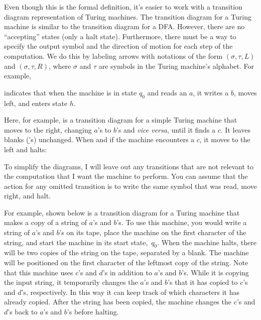 \medskip

Even though this is the formal definition, it's easier to work with
a transition diagram representation of Turing machines.  The transition
diagram for a Turing machine is similar to the transition diagram for
a DFA.  However, there are no ``accepting'' states (only a halt state).
Furthermore, there must be a way to specify the output symbol and
the direction of motion for each step of the computation.
We do this by labeling arrows with notations of the
form $(\sigma,\tau,L)$ and $(\sigma,\tau,R)$, where
$\sigma$ and $\tau$ are symbols in the Turing machine's alphabet.
For example,

\medbreak
\centerline{}
\medbreak

\noindent indicates that when the machine is in state $q_0$ and
reads an $a$, it writes a $b$, moves left, and enters state $h$.


Here, for example, is a transition diagram for a simple Turing machine
that moves to the right, changing $a$'s to $b$'s and \textit{vice
versa}, until it finds a $c$.  It leaves blanks (\b's) unchanged.
When and if the machine encounters a $c$, it moves to the left
and halts:

\medbreak
\centerline{}
\medbreak


To simplify the diagrams, I will leave out any transitions that are
not relevant to the computation that I want the machine to perform.
You can assume that the action for any omitted transition is
to write the same symbol that was read, move right, and halt.

For example, shown below is a transition diagram for a Turing machine
that makes a copy of a string of $a$'s and $b$'s.  To use this machine,
you would write a string of $a$'s and $b$'s on its tape, place
the machine on the first character of the string, and start the
machine in its start state,~$q_0$.  When the machine halts, there will be
two copies of the string on the tape, separated by a blank.
The machine will be positioned on the first character of the leftmost
copy of the string.  Note that this machine uses $c$'s and
$d$'s in addition to $a$'s and $b$'s.  While it is copying the
input string, it temporarily changes the $a$'s and $b$'s that it
has copied to $c$'s and $d$'s, respectively.  In this way it can 
keep track of which characters it has already copied.  After the
string has been copied, the machine changes the $c$'s and $d$'s
back to $a$'s and $b$'s before halting.

\breakSixByNine

